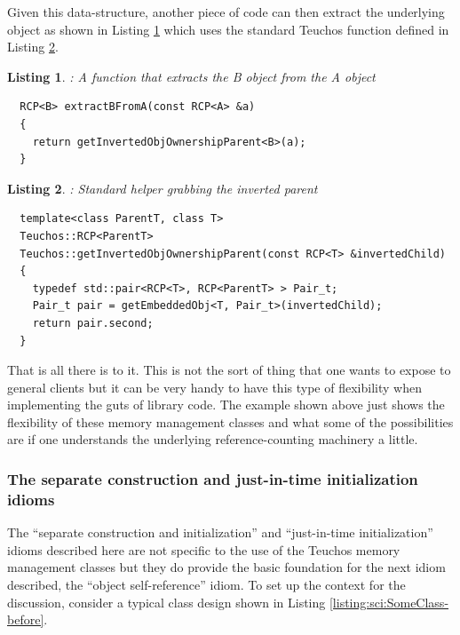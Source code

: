 \documentclass[pdf,ps2pdf,11pt]{SANDreport}
\newtheorem{listing}{Listing}
\begin{document}
Given this data-structure, another piece of code can then extract the
underlying {} object as shown in Listing
{}\ref{listing:Extract_B_from_A} which uses the standard Teuchos
function {} defined in
Listing {}\ref{listing:getInvertedObjOwnershipParent}.

\begin{listing}: A function that extracts the B object from the A object \\
\label{listing:Extract_B_from_A}
{\small\begin{verbatim}
  RCP<B> extractBFromA(const RCP<A> &a)
  {
    return getInvertedObjOwnershipParent<B>(a);
  }
\end{verbatim}}
\end{listing}


\begin{listing}: Standard helper grabbing the inverted parent \\
\label{listing:getInvertedObjOwnershipParent}
{\small\begin{verbatim}
  template<class ParentT, class T>
  Teuchos::RCP<ParentT>
  Teuchos::getInvertedObjOwnershipParent(const RCP<T> &invertedChild)
  {
    typedef std::pair<RCP<T>, RCP<ParentT> > Pair_t;
    Pair_t pair = getEmbeddedObj<T, Pair_t>(invertedChild);
    return pair.second;
  }
\end{verbatim}}
\end{listing}


That is all there is to it.  This is not the sort of thing that one wants to
expose to general clients but it can be very handy to have this type of
flexibility when implementing the guts of library code.  The example shown
above just shows the flexibility of these memory management classes and what
some of the possibilities are if one understands the underlying
reference-counting machinery a little.


%
{}\subsubsection{The separate construction and just-in-time
initialization idioms}
\label{sec:separate-construct-init}
%

The ``separate construction and initialization'' and ``just-in-time
initialization'' idioms described here are not specific to the use of the
Teuchos memory management classes but they do provide the basic foundation for
the next idiom described, the ``object self-reference'' idiom.  To set up the
context for the discussion, consider a typical class design shown in Listing
{}\ref{listing:sci:SomeClass-before}.
\end{document}
